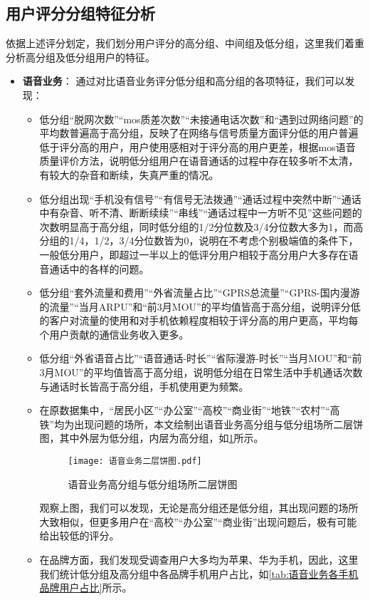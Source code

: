 \documentclass{MathorCupmodeling}
\begin{document}
	\subsection{用户评分分组特征分析}
	依据上述评分划定，我们划分用户评分的高分组、中间组及低分组，这里我们着重分析高分组及低分组用户的特征。
	\begin{itemize}
		\item \textbf{语音业务}：
		通过对比语音业务评分低分组和高分组的各项特征，我们可以发现：
		\begin{itemize}
			\item 低分组“脱网次数”“mos质差次数”“未接通电话次数”和“遇到过网络问题”的平均数普遍高于高分组，反映了在网络与信号质量方面评分低的用户普遍低于评分高的用户，用户使用感相对于评分高的用户更差，根据mos语音质量评价方法，说明低分组用户在语音通话的过程中存在较多听不太清，有较大的杂音和断续，失真严重的情况。
			\item 低分组出现“手机没有信号”“有信号无法拨通”“通话过程中突然中断”“通话中有杂音、听不清、断断续续”“串线”“通话过程中一方听不见”这些问题的次数明显高于高分组，同时低分组的1/2分位数及3/4分位数大多为1，而高分组的1/4，1/2，3/4分位数皆为0，说明在不考虑个别极端值的条件下，一般低分用户，即超过一半以上的低评分用户相较于高分用户大多存在语音通话中的各样的问题。
			\item 低分组“套外流量和费用”“外省流量占比”“GPRS总流量”“GPRS-国内漫游的流量”“当月ARPU”和“前3月MOU”的平均值皆高于高分组，说明评分低的客户对流量的使用和对手机依赖程度相较于评分高的用户更高，平均每个用户贡献的通信业务收入更多。
			\item 低分组“外省语音占比”“语音通话-时长”“省际漫游-时长”“当月MOU”和“前3月MOU”的平均值皆高于高分组，说明低分组在日常生活中手机通话次数与通话时长皆高于高分组，手机使用更为频繁。
			\item 在原数据集中，“居民小区”“办公室”“高校”“商业街”“地铁”“农村”“高铁”均为出现问题的场所，本文绘制出语音业务高分组与低分组场所二层饼图，其中外层为低分组，内层为高分组，如\textcolor{blue}{\cref{fig:语音业务高分组与低分组场所二层饼图}}所示。
			\begin{figure}[H]
				\centering
				\texttt{[image: 语音业务二层饼图.pdf]}
				\caption{语音业务高分组与低分组场所二层饼图}
				\label{fig:语音业务高分组与低分组场所二层饼图}
			\end{figure}
			观察上图，我们可以发现，无论是高分组还是低分组，其出现问题的场所大致相似，但更多用户在“高校”“办公室”“商业街”出现问题后，极有可能给出较低的评分。
			\item 在品牌方面，我们发现受调查用户大多均为苹果、华为手机，因此，这里我们统计低分组及高分组中各品牌手机用户占比，如\textcolor{blue}{\cref{tab:语音业务各手机品牌用户占比}}所示。

\end{itemize}
\end{itemize}
\end{document}

